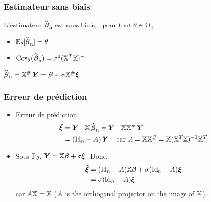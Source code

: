 \begin{frame}
\frametitle{Estimateur sans biais}
\begin{theo}
L'estimateur $\operatorname{\widehat{\boldsymbol{\beta}}_n}$ est sans biais, \ie\ pour tout $\theta \in \Theta$,
\begin{itemize}
\item $\operatorname{{\mathbb E}}_{\theta}[\operatorname{\widehat{\boldsymbol{\beta}}_n}]= \theta$
\item $\mathrm{Cov}_{\theta}(\operatorname{\widehat{\boldsymbol{\beta}}_n})= \sigma^2 (\mathbb{X}^T \mathbb{X})^{-1}$.
\end{itemize}
\end{theo}
\centerline{\alert{$\operatorname{\widehat{\boldsymbol{\beta}}_n} = \mathbb{X}^{\#} \operatorname{\boldsymbol{Y}}= \boldsymbol{\beta} + \sigma \mathbb{X}^{\#} \boldsymbol{\xi}$.}}
\end{frame}

\begin{frame}
\frametitle{Erreur de prédiction}
\begin{itemize}
\item \alert{Erreur de prédiction}:
\begin{align*}
\boldsymbol{\hat{\xi}}
&= \operatorname{\boldsymbol{Y}} - \mathbb{X} \operatorname{\widehat{\boldsymbol{\beta}}_n}= \operatorname{\boldsymbol{Y}} - \mathbb{X} \mathbb{X}^{\#} \operatorname{\boldsymbol{Y}} \\
&= (\mathrm{Id}_{n} - A) \operatorname{\boldsymbol{Y}} \quad \text{car $A = \mathbb{X} \mathbb{X}^{\#}= \mathbb{X} (\mathbb{X}^T \mathbb{X})^{-1} \mathbb{X}^T$} 
\end{align*}
\item Sous $\operatorname{{\mathbb P}}_\theta$, $\operatorname{\boldsymbol{Y}}= \mathbb{X} \boldsymbol{\beta} +  \sigma \boldsymbol{\xi}$. Donc,
\begin{align*}
\boldsymbol{\hat{\xi}} &= (\mathrm{Id}_{n}-A) \mathbb{X} \boldsymbol{\beta} + \sigma (\mathrm{Id}_{n}-A)  \boldsymbol{\xi} \\
         &= \sigma (\mathrm{Id}_{n}-A) \boldsymbol{\xi}
\end{align*}
car $A \mathbb{X}= \mathbb{X}$ ($A$ is the orthogonal projector on the image of $\mathbb{X}$).
\end{itemize}
\end{frame}

